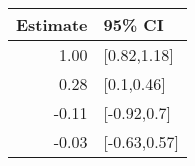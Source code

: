 \begin{tabular}{rl}
  \hline
Estimate & 95\% CI \\ 
  \hline
1.00 & [0.82,1.18] \\ 
  0.28 & [0.1,0.46] \\ 
  -0.11 & [-0.92,0.7] \\ 
  -0.03 & [-0.63,0.57] \\ 
   \hline
\end{tabular}

